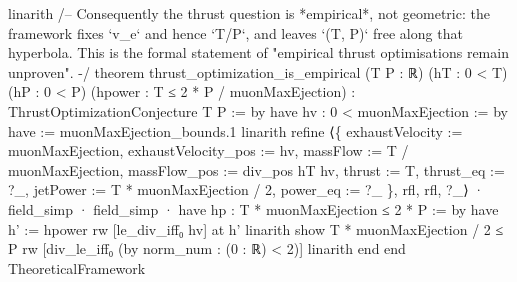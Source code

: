 \documentclass[11pt,a4paper]{article}
\begin{document}
{  linarith
\mbox{}
/-- Consequently the thrust question is *empirical*, not geometric: the
framework fixes `v\_\allowbreak{}e` and hence `T/P`, and leaves `(T, P)` free along that
hyperbola.  This is the formal statement of "empirical thrust optimisations
remain unproven". -/
theorem thrust\_\allowbreak{}optimization\_\allowbreak{}is\_\allowbreak{}empirical (T P : ℝ) (hT : 0 \textless{} T) (hP : 0 \textless{} P)
    (hpower : T ≤ 2 * P / muonMaxEjection) :
    ThrustOptimizationConjecture T P := by
  have hv : 0 \textless{} muonMaxEjection := by
    have := muonMaxEjection\_\allowbreak{}bounds.1
    linarith
  refine ⟨\{ exhaustVelocity := muonMaxEjection, exhaustVelocity\_\allowbreak{}pos := hv,
            massFlow := T / muonMaxEjection, massFlow\_\allowbreak{}pos := div\_\allowbreak{}pos hT hv,
            thrust := T, thrust\_\allowbreak{}eq := ?\_\allowbreak{}, jetPower := T * muonMaxEjection / 2,
            power\_\allowbreak{}eq := ?\_\allowbreak{} \}, rfl, rfl, ?\_\allowbreak{}⟩
  · field\_\allowbreak{}simp
  · field\_\allowbreak{}simp
  · have hp : T * muonMaxEjection ≤ 2 * P := by
      have h' := hpower
      rw [le\_\allowbreak{}div\_\allowbreak{}iff₀ hv] at h'
      linarith
    show T * muonMaxEjection / 2 ≤ P
    rw [div\_\allowbreak{}le\_\allowbreak{}iff₀ (by norm\_\allowbreak{}num : (0 : ℝ) \textless{} 2)]
    linarith
\mbox{}
end
\mbox{}
end TheoreticalFramework
\mbox{}
}

\clearpage
\end{document}
